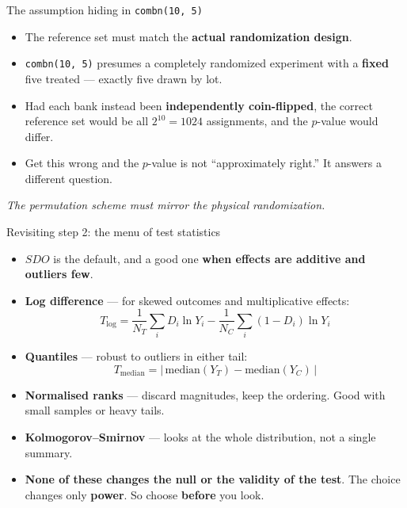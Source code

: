 \documentclass[
  11pt,
  ignorenonframetext,
  aspectratio=169,
]{beamer}
\providecommand{\tightlist}{%
  \setlength{\itemsep}{0pt}\setlength{\parskip}{0pt}}
\begin{document}
\begin{frame}[fragile]{The assumption hiding in \texttt{combn(10,\ 5)}}
\protect{}\label{the-assumption-hiding-in-combn10-5}
\begin{itemize}
\tightlist
\item
  The reference set must match the \textbf{actual randomization design}.
\item
  \texttt{combn(10,\ 5)} presumes a completely randomized experiment
  with a \textbf{fixed} five treated --- exactly five drawn by lot.
\item
  Had each bank instead been \textbf{independently coin-flipped}, the
  correct reference set would be all \(2^{10} = 1024\) assignments, and
  the \(p\)-value would differ.
\item
  Get this wrong and the \(p\)-value is not ``approximately right.'' It
  answers a different question.
\end{itemize}

\begin{center}
\emph{The permutation scheme must mirror the physical randomization.}
\end{center}
\end{frame}

\begin{frame}{Revisiting step 2: the menu of test statistics}
\protect{}\label{revisiting-step-2-the-menu-of-test-statistics}
\begin{itemize}
\tightlist
\item
  \(SDO\) is the default, and a good one \textbf{when effects are
  additive and outliers few}.
\item
  \textbf{Log difference} --- for skewed outcomes and multiplicative
  effects: \[
  T_{\log} = \frac{1}{N_T}\sum_i D_i \ln Y_i - \frac{1}{N_C}\sum_i (1 - D_i)\ln Y_i
  \]
\item
  \textbf{Quantiles} --- robust to outliers in either tail: \[
  T_{\text{median}} = \big|\,\text{median}(Y_T) - \text{median}(Y_C)\,\big|
  \]
\item
  \textbf{Normalised ranks} --- discard magnitudes, keep the ordering.
  Good with small samples or heavy tails.
\item
  \textbf{Kolmogorov--Smirnov} --- looks at the whole distribution, not
  a single summary.
\item
  \textbf{None of these changes the null or the validity of the test}.
  The choice changes only \textbf{power}. So choose \textbf{before} you
  look.
\end{itemize}
\end{frame}
\end{document}
